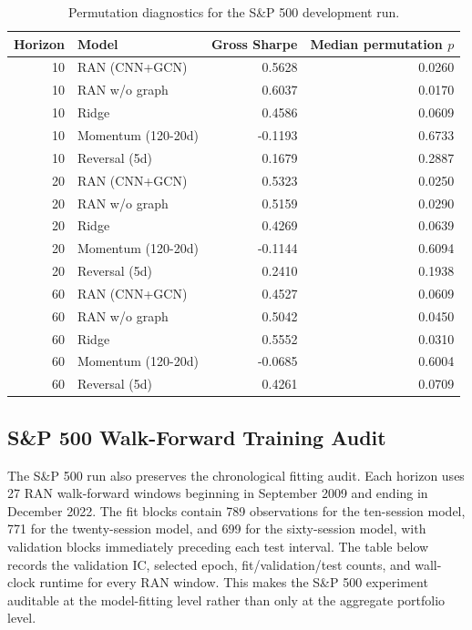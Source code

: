 \documentclass[10pt]{article}
\begin{document}
\begin{table}[tbp]
\centering\scriptsize
\caption{Permutation diagnostics for the S\&P 500 development run.}
\label{tab:sp500perm}
\begin{tabular}{rlrr}
\toprule
Horizon & Model & Gross Sharpe & Median permutation $p$\\
\midrule
10 & RAN (CNN+GCN) & 0.5628 & 0.0260 \\
10 & RAN w/o graph & 0.6037 & 0.0170 \\
10 & Ridge & 0.4586 & 0.0609 \\
10 & Momentum (120-20d) & -0.1193 & 0.6733 \\
10 & Reversal (5d) & 0.1679 & 0.2887 \\
20 & RAN (CNN+GCN) & 0.5323 & 0.0250 \\
20 & RAN w/o graph & 0.5159 & 0.0290 \\
20 & Ridge & 0.4269 & 0.0639 \\
20 & Momentum (120-20d) & -0.1144 & 0.6094 \\
20 & Reversal (5d) & 0.2410 & 0.1938 \\
60 & RAN (CNN+GCN) & 0.4527 & 0.0609 \\
60 & RAN w/o graph & 0.5042 & 0.0450 \\
60 & Ridge & 0.5552 & 0.0310 \\
60 & Momentum (120-20d) & -0.0685 & 0.6004 \\
60 & Reversal (5d) & 0.4261 & 0.0709 \\
\bottomrule
\end{tabular}
\end{table}

\subsection{S\&P 500 Walk-Forward Training Audit}

The S\&P 500 run also preserves the chronological fitting audit. Each horizon uses 27 RAN walk-forward windows beginning in September 2009 and ending in December 2022. The fit blocks contain 789 observations for the ten-session model, 771 for the twenty-session model, and 699 for the sixty-session model, with validation blocks immediately preceding each test interval. The table below records the validation IC, selected epoch, fit/validation/test counts, and wall-clock runtime for every RAN window. This makes the S\&P 500 experiment auditable at the model-fitting level rather than only at the aggregate portfolio level.
\end{document}
